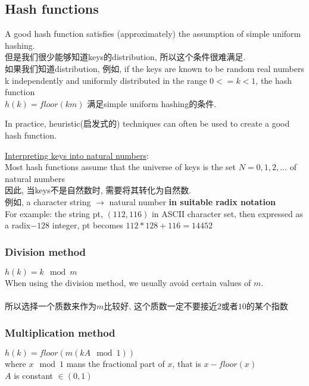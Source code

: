 \documentclass{article}
\begin{document}
\subsection{Hash functions}
A good hash function satisfies (approximately) the assumption of simple uniform hashing.\\
但是我们很少能够知道keys的distribution, 所以这个条件很难满足.\\
如果我们知道distribution, 例如, if the keys are known to be random real numbers k independently and uniformly distributed in the range $0<=k<1$, the hash function\\
$h(k) = floor(km)$ 满足simple uniform hashing的条件.

In practice, heuristic(启发式的) techniques can often be used to create a good hash function.

\underline{Interpreting keys into natural numbers}:\\
Most hash functions assume that the universe of keys is the set $N={0,1,2, \ldots}$ of natural numbers\\
因此, 当keys不是自然数时, 需要将其转化为自然数.\\
例如, a character string $\rightarrow$ natural number \textbf{in suitable radix notation}\\
For example: the string pt, $(112, 116)$ in ASCII character set, then expressed as a radix$-128$ integer, pt becomes $112*128+116=14452$

\subsubsection{Division method}
$h(k)=k \mod m$\\
When using the division method, we usually avoid certain values of $m$.\\
\\
所以选择一个质数来作为$m$比较好, 这个质数一定不要接近$2$或者$10$的某个指数

\subsubsection{Multiplication method}
$h(k)=floor(m(kA\mod 1))$\\
where $x \mod 1$ mans the fractional part of $x$, that is $x - floor(x)$\\
$A$ is constant $\in (0,1)$
\end{document}
